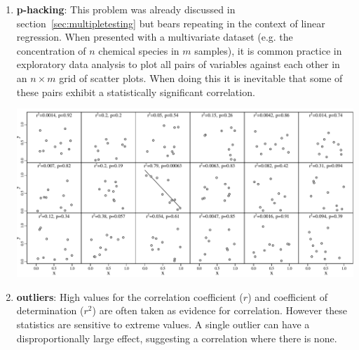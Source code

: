 \begin{enumerate}
\item{\bf p-hacking}: This problem was already discussed in
  section~\ref{sec:multipletesting} but bears repeating in the context
  of linear regression. When presented with a multivariate dataset
  (e.g. the concentration of $n$ chemical species in $m$ samples), it
  is common practice in exploratory data analysis to plot all pairs of
  variables against each other in an $n\times{m}$ grid of scatter
  plots. When doing this it is inevitable that some of these pairs
  exhibit a statistically significant correlation.

\noindent\begin{minipage}[t][][b]{\textwidth-27pt}
  \includegraphics[width=\textwidth]{../figures/regression-p-hacking.pdf}
  \label{fig:regression-p-hacking}
\end{minipage}

\item{\bf outliers}: High values for the correlation coefficient ($r$)
  and coefficient of determination ($r^2$) are often taken as evidence
  for correlation. However these statistics are sensitive to extreme
  values.  A single outlier can have a disproportionally large effect,
  suggesting a correlation where there is none.


\end{enumerate}
